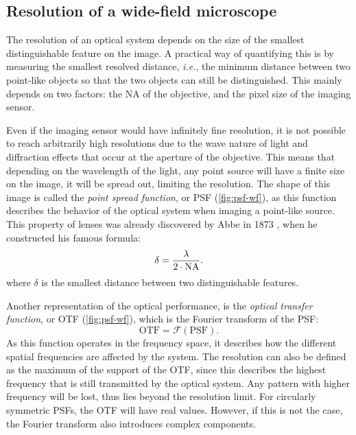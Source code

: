 
  \subsection{Resolution of a wide-field microscope}
    \label{sec:resolution}
    The resolution of an optical system depends on the size of the smallest distinguishable feature on the image. A practical way of quantifying this is by measuring the smallest resolved distance, \textit{i.e.}, the minimum distance between two point-like objects so that the two objects can still be distinguished. This mainly depends on two factors: the NA of the objective, and the pixel size of the imaging sensor.

    Even if the imaging sensor would have infinitely fine resolution, it is not possible to reach arbitrarily high resolutions due to the wave nature of light and diffraction effects that occur at the aperture of the objective. This means that depending on the wavelength of the light, any point source will have a finite size on the image, it will be spread out, limiting the resolution. The shape of this image is called the \textit{point spread function}, or PSF (\autoref{fig:psf-wf}), as this function describes the behavior of the optical system when imaging a point-like source. This property of lenses was already discovered by Abbe in 1873 \cite{abbe_beitrage_1873}, when he constructed his famous formula:
    \begin{equation}
      \delta = \frac{\lambda}{2 \cdot \operatorname{NA}}.
      \label{eq:abbe}
    \end{equation}
    where $\delta$ is the smallest distance between two distinguishable features.

    Another representation of the optical performance, is the \textit{optical transfer function}, or OTF (\autoref{fig:psf-wf}), which is the Fourier transform of the PSF:
    \begin{equation}
      \text{OTF} = \mathcal{F}(\text{PSF}).
    \end{equation}
    As this function operates in the frequency space, it describes how the different spatial frequencies are affected by the system. The resolution can also be defined as the maximum of the support of the OTF, since this describes the highest frequency that is still transmitted by the optical system. Any pattern with higher frequency will be lost, thus lies beyond the resolution limit. For circularly symmetric PSFs, the OTF will have real values. However, if this is not the case, the Fourier transform also introduces complex components.

